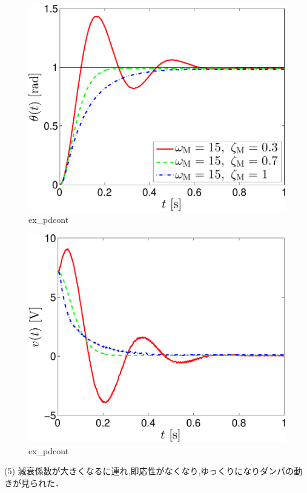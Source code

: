 \begin{figure}[h]
  \centering
  \includegraphics[scale=0.5]{sozai/figure_pdcont_angle-crop.pdf}
  \caption{ex\_pdcont}
\end{figure}

\begin{figure}[h]
  \centering
  \includegraphics[scale=0.5]{sozai/figure_pdcont_volt-crop.pdf}
  \caption{ex\_pdcont}
\end{figure}

\newpage

(5) 減衰係数が大きくなるに連れ,即応性がなくなり,ゆっくりになりダンパの動きが見られた．

